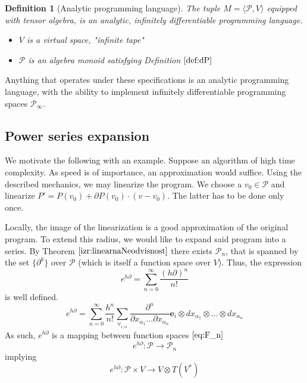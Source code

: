 \documentclass{article}
\newcommand{\e}{\mathbf{e}}
\newcommand{\dP}{\mathcal{P}}
\newcommand{\D}{\partial}
\newtheorem{definicija}{Definition}[section]
\begin{document}
\begin{definicija}[Analytic programming language]
The tuple $M=\langle\dP, V\rangle$ equipped with tensor algebra, is an analytic, infinitely  differentiable programming language.
   
    \begin{itemize}
    \item
    $V$ is a virtual space, "infinite tape"
    \item
    $\dP$ is an algebra monoid satisfying Definition $\ref{def:dP}$
    \end{itemize}
  \end{definicija}
Anything that operates under these specifications is an analytic programming language, with the ability to implement infinitely differentiable programming spaces $\dP_\infty$.

 \subsection{Power series expansion}\label{sec:Vrsta}
 
We motivate the following with an example. Suppose an algorithm of high time complexity. As speed is of importance, an approximation would suffice. Using the described mechanics, we may linearize the program. We choose a $v_0\in\dP$ and linearize $P'=P(v_0)+\D P(v_0)\cdot(v-v_0)$. The latter has to be done only once.
 
 Locally, the image of the linearization is a good approximation of the original program. To extend this radius, we would like to expand said program into a series. By Theorem $\ref{izr:linearnaNeodvisnost}$  there exists $\dP_n$, that is spanned by the set $\{\D^k\}$ over $\dP$ (which is itself a function space over $V$). Thus, the expression
 \begin{equation}
 	e^{h\D}=\sum\limits_{n=0}^{\infty}\frac{(h\D)^n}{n!}
 \end{equation}
 is well defined.
 \begin{equation}\label{eq:e^d}
 	e^{h\D}=\sum\limits_{n=0}^{\infty}\frac{h^n}{n!}\sum_{\forall_{i,\alpha}}\frac{\partial^n}{\partial
 		    x_{\alpha_1}\ldots \partial x_{\alpha_n}}\e_i\otimes
 		  dx_{\alpha_1}\otimes\ldots \otimes dx_{\alpha_n}
 \end{equation}
As such, $e^{h\D}$ is a mapping between function spaces $\eqref{eq:F_n}$
 \begin{equation}
 	e^{h\D}:\dP\to\dP_n
 \end{equation}
 implying
  \begin{equation}\label{eq:specProg}
  	e^{h\D}:\dP\times V\to V\otimes T(V^*)
  \end{equation}
  
\end{document}

